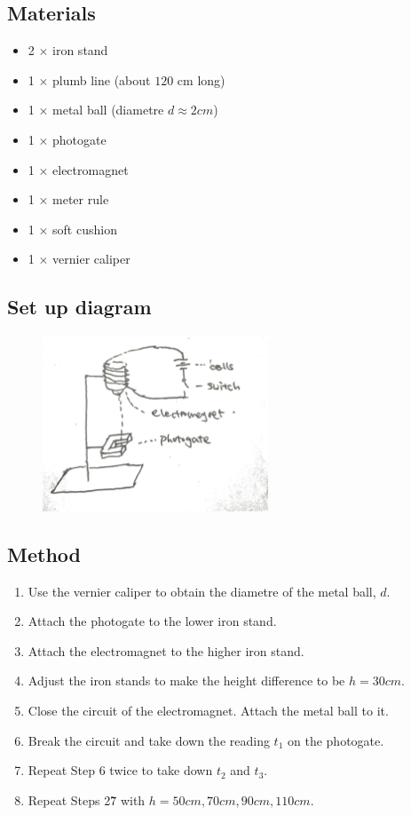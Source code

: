 \documentclass[a4paper]{article}
\begin{document}
\subsection{Materials}

\begin{itemize}
    \item 2 $\times$ iron stand
    \item 1 $\times$ plumb line (about $120$ cm long)
    \item 1 $\times$ metal ball (diametre $d \approx 2cm$)
    \item 1 $\times$ photogate
    \item 1 $\times$ electromagnet
    \item 1 $\times$ meter rule
    \item 1 $\times$ soft cushion
    \item 1 $\times$ vernier caliper
\end{itemize}

\subsection{Set up diagram}

\begin{figure}[h!]
    \centering
    \includegraphics[width = 0.6\textwidth]{setup.png}
\end{figure}

\subsection{Method}

\begin{enumerate}[1.]
    \item Use the vernier caliper to obtain the diametre of the metal ball, $d$.
    \item Attach the photogate to the lower iron stand.
    \item Attach the electromagnet to the higher iron stand.
    \item Adjust the iron stands to make the height difference to be $h = 30 cm$.
    \item Close the circuit of the electromagnet. Attach the metal ball to it.
    \item Break the circuit and take down the reading $t_1$ on the photogate.
    \item Repeat Step 6 twice to take down $t_2$ and $t_3$.
    \item Repeat Steps 2\~7 with $h = 50cm,70cm,90cm,110cm$.
\end{enumerate}
\end{document}
